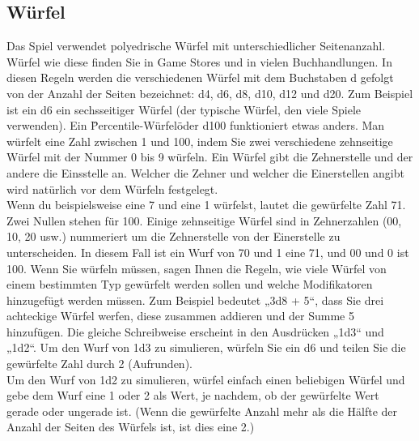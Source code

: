 \subsection{Würfel}
Das Spiel verwendet polyedrische Würfel mit unterschiedlicher Seitenanzahl. Würfel wie diese finden Sie in Game Stores und in vielen Buchhandlungen. In diesen Regeln werden die verschiedenen Würfel mit dem Buchstaben d gefolgt von der Anzahl der Seiten bezeichnet: d4, d6, d8, d10, d12 und d20. Zum Beispiel ist ein d6 ein sechsseitiger Würfel (der typische Würfel, den viele Spiele verwenden). Ein \"Percentile-Würfel\" oder d100 funktioniert etwas anders. Man würfelt eine Zahl zwischen 1 und 100, indem Sie zwei verschiedene zehnseitige Würfel mit der Nummer 0 bis 9 würfeln. Ein Würfel gibt die Zehnerstelle und der andere die Einsstelle an. Welcher die Zehner und welcher die Einerstellen angibt wird natürlich vor dem Würfeln festgelegt. \\
Wenn du beispielsweise eine 7 und eine 1 würfelst, lautet die gewürfelte Zahl 71. Zwei Nullen stehen für 100. Einige zehnseitige Würfel sind in Zehnerzahlen (00, 10, 20 usw.) nummeriert um die Zehnerstelle von der Einerstelle zu unterscheiden. In diesem Fall ist ein Wurf von 70 und 1 eine 71, und 00 und 0 ist 100. Wenn Sie würfeln müssen, sagen Ihnen die Regeln, wie viele Würfel von einem bestimmten Typ gewürfelt werden sollen und welche Modifikatoren hinzugefügt werden müssen. Zum Beispiel bedeutet „3d8 + 5“, dass Sie drei achteckige Würfel werfen, diese zusammen addieren und der Summe 5 hinzufügen. Die gleiche Schreibweise erscheint in den Ausdrücken „1d3“ und „1d2“. Um den Wurf von 1d3 zu simulieren, würfeln Sie ein d6 und teilen Sie die gewürfelte Zahl durch 2 (Aufrunden).\\
Um den Wurf von 1d2 zu simulieren, würfel einfach einen beliebigen Würfel und gebe dem Wurf eine 1 oder 2 als Wert, je nachdem, ob der gewürfelte Wert gerade oder ungerade ist. (Wenn die gewürfelte Anzahl mehr als die Hälfte der Anzahl der Seiten des Würfels ist, ist dies eine 2.)

